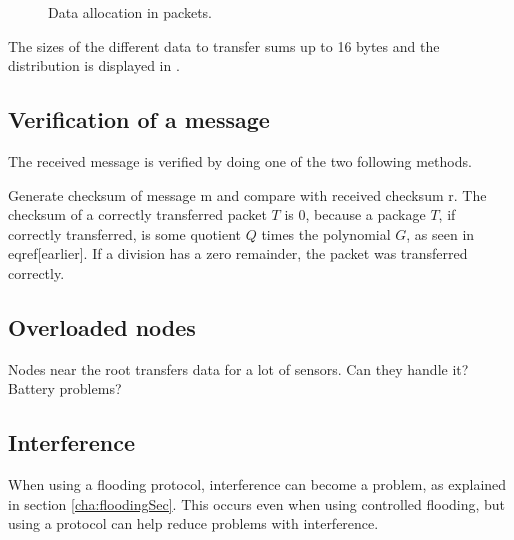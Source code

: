\begin{figure}[h!]
	\centering
	\caption{Data allocation in packets.}
	\label{fig:dataalloc}
\end{figure}

The sizes of the different data to transfer sums up to 16 bytes and the distribution is displayed in .


\subsection{Verification of a message}
The received message is verified by doing one of the two following methods. 

Generate checksum of message m and compare with received checksum r.
The checksum of a correctly transferred packet $T$ is 0, because a package $T$, if correctly transferred, is some quotient $Q$ times the polynomial $G$, as seen in eqref[earlier]. If a division has a zero remainder, the packet was transferred correctly.

\subsection{Overloaded nodes}
Nodes near the root transfers data for a lot of sensors. Can they handle it? Battery problems? 

\subsection{Interference}
When using a flooding protocol, interference can become a problem, as explained in section \ref{cha:floodingSec}. This occurs even when using controlled flooding, but using a protocol can help reduce problems with interference.

